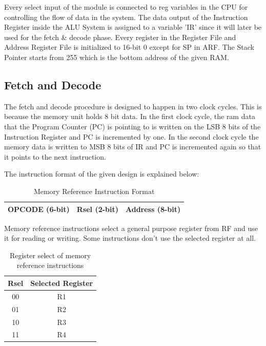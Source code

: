 \documentclass[pdftex,12pt,a4paper]{article}
\begin{document}
Every select input of the module is connected to reg variables in the
CPU for controlling the flow of data in the system. The data output
of the Instruction Register inside the ALU System is assigned to a
variable 'IR' since it will later be used for the fetch & decode phase.
Every register in the Register File and Address Register File is
initialized to 16-bit 0 except for SP in ARF. The Stack Pointer starts
from 255 which is the bottom address of the given RAM.

\subsection{Fetch and Decode}
The fetch and decode procedure is designed to happen in two clock
cycles. This is because the memory unit holds 8 bit data. In the first
clock cycle, the ram data that the Program Counter (PC) is pointing to
is written on the LSB 8 bits of the Instruction Register and PC is
incremented by one. In the second clock cycle the memory data is
written to MSB 8 bits of IR and PC is incremented again so that it
points to the next instruction.

The instruction format of the given design is explained below:

\begin{table}[H]
\centering
\begin{tabular}{|c|c|c|}
  \hline
  OPCODE (6-bit) & Rsel (2-bit) & Address (8-bit)\\
  \hline
\end{tabular}
\caption{Memory Reference Instruction Format\cite{ref1}}
\end{table}

Memory reference instructions select a general purpose register from
RF and use it for reading or writing. Some instructions don't use the
selected register at all.

\begin{table}[H]
\centering
\begin{tabular}{|c|c|}
  \hline
  Rsel & Selected Register\\
  \hline
  00 & R1\\
  \hline
  01 & R2\\
  \hline
  10 & R3\\
  \hline
  11 & R4\\
  \hline
\end{tabular}
\caption{Register select of memory reference instructions\cite{ref1}}
\end{table}
\end{document}
